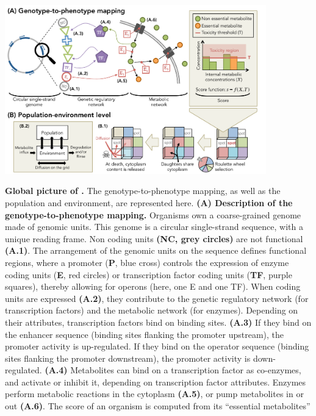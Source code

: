 \begin{figurehere}
\centering 
\includegraphics[width=0.85\textwidth]{figures/general_algorithm.pdf}
\caption[Global picture of {\packageName}.]{\small{\textbf{Global picture of {\packageName}.} The genotype-to-phenotype mapping, as well as the population and environment, are represented here. \textbf{(A) Description of the genotype-to-phenotype mapping.} Organisms own a coarse-grained genome made of genomic units. This genome is a circular single-strand sequence, with a unique reading frame. Non coding units \textbf{(NC, grey circles)} are not functional \textbf{(A.1)}. The arrangement of the genomic units on the sequence defines functional regions, where a promoter (\textbf{P}, blue cross) controls the expression of enzyme coding units (\textbf{E}, red circles) or transcription factor coding units (\textbf{TF}, purple squares), thereby allowing for operons (here, one E and one TF). When coding units are expressed \textbf{(A.2)}, they contribute to the genetic regulatory network (for transcription factors) and the metabolic network (for enzymes).
Depending on their attributes, transcription factors bind on binding sites. \textbf{(A.3)} If they bind on the enhancer sequence (binding sites flanking the promoter upstream), the promoter activity is up-regulated. If they bind on the operator sequence (binding sites flanking the promoter downstream), the promoter activity is down-regulated. \textbf{(A.4)} Metabolites can bind on a transcription factor as co-enzymes, and activate or inhibit it, depending on transcription factor attributes.
Enzymes perform metabolic reactions in the cytoplasm \textbf{(A.5)}, or pump metabolites in or out \textbf{(A.6)}. The score of an organism is computed from its ``essential metabolites''
}}
\end{figurehere}
